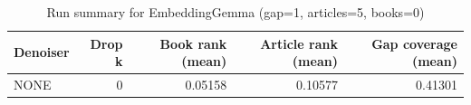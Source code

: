 \begin{table}
\caption{Run summary for EmbeddingGemma (gap=1, articles=5, books=0)}
\label{tab:summary_gap1_embeddinggemma_a5_b0}
\begin{tabular}{lrrrr}
\toprule
Denoiser & Drop k & Book rank (mean) & Article rank (mean) & Gap coverage (mean) \\
\midrule
NONE & 0 & 0.05158 & 0.10577 & 0.41301 \\
\bottomrule
\end{tabular}
\end{table}
